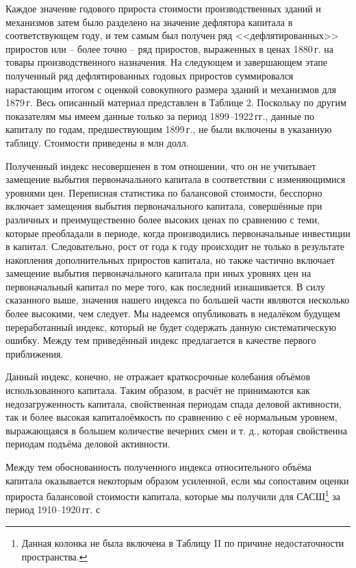 \documentclass[leqno]{article}  %
\begin{document}
Каждое значение годового прироста стоимости производственных зданий и механизмов затем было разделено на значение дефлятора капитала в соответствующем году, и тем самым был получен ряд <<дефлятированных>> приростов или -- более точно -- ряд приростов, выраженных в ценах 1880\,г. на товары производственного назначения. На следующем и завершающем этапе полученный ряд дефлятированных годовых приростов суммировался нарастающим итогом с оценкой совокупного размера зданий и механизмов для 1879\,г. Весь описанный материал представлен в Таблице 2. Поскольку по другим показателям мы имеем данные только за период 1899--1922\,гг., данные по капиталу по годам, предшествующим 1899\,г., не были включены в указанную таблицу. Стоимости приведены в млн долл.
\par
Полученный индекс несовершенен в том отношении, что он не учитывает замещение выбытия первоначального капитала в соответствии с изменяющимися уровнями цен. Переписная статистика по балансовой стоимости, бесспорно включает замещения выбытия первоначального капитала, совершённые при различных и преимущественно более высоких ценах по сравнению с теми, которые преобладали в периоде, когда производились первоначальные инвестиции в капитал. Следовательно, рост от года к году происходит не только в результате накопления дополнительных приростов капитала, но также частично включает замещение выбытия первоначального капитала при иных уровнях цен на первоначальный капитал по мере того, как последний изнашивается. В силу сказанного выше, значения нашего индекса по большей части являются несколько более высокими, чем следует. Мы надеемся опубликовать в недалёком будущем переработанный индекс, который не будет содержать данную систематическую ошибку. Между тем приведённый индекс предлагается в качестве первого приближения.
\par
Данный индекс, конечно, не отражает краткосрочные колебания объёмов использованного капитала. Таким образом, в расчёт не принимаются как недозагруженность капитала, свойственная периодам спада деловой активности, так и более высокая капиталоёмкость по сравнению с её нормальным уровнем, выражающаяся в большем количестве вечерних смен и т. д., которая свойственна периодам подъёма деловой активности.
\par
Между тем обоснованность полученного индекса относительного объёма капитала оказывается некоторым образом усиленной, если мы сопоставим оценки прироста балансовой стоимости капитала, которые мы получили для САСШ\footnote{Данная колонка не была включена в Таблицу II по причине недостаточности пространства.} за период 1910--1920\,гг. с
\end{document}
